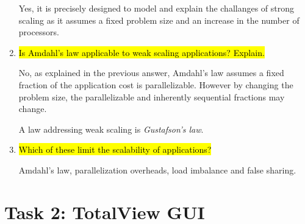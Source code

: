 \documentclass{article}
\begin{document}
\begin{enumerate}
	Yes, it is precisely designed to model and explain the challanges of strong scaling as it assumes a fixed problem size and an increase in the number of processors.
	
	\item \hl{Is Amdahl's law applicable to weak scaling applications? Explain.}

	No, as explained in the previous answer, Amdahl's law assumes a fixed fraction of the application cost is parallelizable. However by changing the problem size, the parallelizable and inherently sequential fractions may change.

	A law addressing weak scaling is \emph{Gustafson's law}.
	
	\item \hl{Which of these limit the scalability of applications?}

	Amdahl's law, parallelization overheads, load imbalance and false sharing.
	
\end{enumerate}


\section{Task 2: TotalView GUI}
\end{document}
